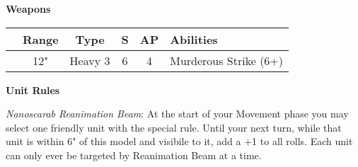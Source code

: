 \begin{minipage}[t]{0.72\textwidth}
	
	\vspace*{2em}
	\textbf{Weapons}
	
	\begin{tabular}{m{95 pt} *{4}{c} >{\raggedright\arraybackslash}p{130pt}}
		& Range & Type & S & AP & Abilities \\
		\hline
		\quickref{Atomiser Beam Lance} & 12" & Heavy 3 & 6 & 4 & Murderous Strike (6+) \\
	\end{tabular}

	\vspace*{2em}
	\textbf{Unit Rules}
	
	\textit{Nanoscarab Reanimation Beam}: At the start of your Movement phase you may select one friendly unit with the  special rule. Until your next turn, while that unit is within 6" of this model and visibile to it, add a +1 to all  rolls. Each unit can only ever be targeted by Reanimation Beam at a time.
\end{minipage}



\newpage
